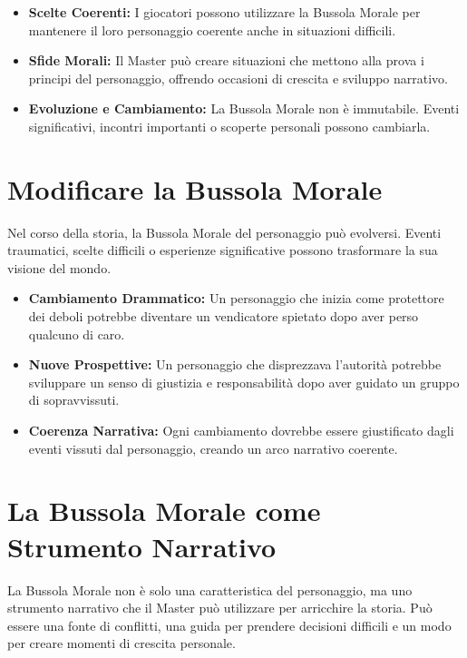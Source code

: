 \documentclass[../manuale_main.tex]{subfiles}
\begin{document}
\begin{itemize}
    \item \textbf{Scelte Coerenti:} I giocatori possono utilizzare la Bussola Morale per mantenere il loro personaggio coerente anche in situazioni difficili.
    \item \textbf{Sfide Morali:} Il Master può creare situazioni che mettono alla prova i principi del personaggio, offrendo occasioni di crescita e sviluppo narrativo.
    \item \textbf{Evoluzione e Cambiamento:} La Bussola Morale non è immutabile. Eventi significativi, incontri importanti o scoperte personali possono cambiarla.
\end{itemize}

\vspace{0.3cm}

\section{Modificare la Bussola Morale}
Nel corso della storia, la Bussola Morale del personaggio può evolversi. Eventi traumatici, scelte difficili o esperienze significative possono trasformare la sua visione del mondo.

\begin{itemize}
    \item \textbf{Cambiamento Drammatico:} Un personaggio che inizia come protettore dei deboli potrebbe diventare un vendicatore spietato dopo aver perso qualcuno di caro.
    \item \textbf{Nuove Prospettive:} Un personaggio che disprezzava l'autorità potrebbe sviluppare un senso di giustizia e responsabilità dopo aver guidato un gruppo di sopravvissuti.
    \item \textbf{Coerenza Narrativa:} Ogni cambiamento dovrebbe essere giustificato dagli eventi vissuti dal personaggio, creando un arco narrativo coerente.
\end{itemize}

\vspace{0.3cm}

\section{La Bussola Morale come Strumento Narrativo}
La Bussola Morale non è solo una caratteristica del personaggio, ma uno strumento narrativo che il Master può utilizzare per arricchire la storia. Può essere una fonte di conflitti, una guida per prendere decisioni difficili e un modo per creare momenti di crescita personale.
\end{document}
